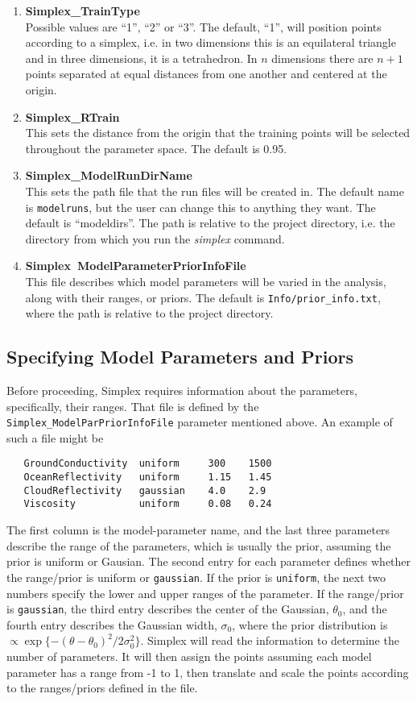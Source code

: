 \documentclass[main.tex]{subfiles}
\begin{document}
\begin{enumerate}\itemsep 0pt
    \item {\bf Simplex\_TrainType}\\
Possible values are ``1'', ``2'' or ``3''. The default, ``1'', will position points according to a simplex, i.e. in two dimensions this is an equilateral triangle and in three dimensions, it is a tetrahedron. In $n$ dimensions there are $n+1$ points separated at equal distances from one another and centered at the origin. 
\item {\bf Simplex\_RTrain}\\
This sets the distance from the origin that the training points will be selected throughout the parameter space. The default is 0.95.
\item {\bf Simplex\_ModelRunDirName}\\
This sets the path file that the run files will be created in. The default name is {\tt{modelruns}}, but the user can change this to anything they want. The default is ``modeldirs''. The path is relative to the project directory, i.e. the directory from which you run the {\it simplex} command.
\item {\bf Simplex\ ModelParameterPriorInfoFile}\\
This file describes which model parameters will be varied in the analysis, along with their ranges, or priors. The default is {\tt Info/prior\_info.txt}, where the path is relative to the project directory.
\end{enumerate}

\subsection{Specifying Model Parameters and Priors}

Before proceeding, Simplex requires information about the parameters, specifically, their ranges. That file is defined by the {\tt Simplex\_ModelParPriorInfoFile} parameter mentioned above. An example of such a file might be
{\tt\begin{verbatim}
   GroundConductivity  uniform     300    1500
   OceanReflectivity   uniform     1.15   1.45
   CloudReflectivity   gaussian    4.0    2.9
   Viscosity           uniform     0.08   0.24
\end{verbatim}
}
The first column is the model-parameter name, and the last three parameters describe the range of the parameters, which is usually the prior, assuming the prior is uniform or Gausian. The second entry for each parameter defines whether the range/prior is uniform or {\tt gaussian}. If the prior is {\tt uniform}, the next two numbers specify the lower and upper ranges of the parameter. If the range/prior is {\tt gaussian}, the third entry describes the center of the Gaussian, $\theta_0$, and the fourth entry describes the Gaussian width, $\sigma_0$, where the prior distribution is $\propto \exp\{-(\theta-\theta_0)^2/2\sigma_0^2\}$. Simplex will read the information to determine the number of parameters. It will then assign the points assuming each model parameter has a range from -1 to 1, then translate and scale the points according to the ranges/priors defined in the file.
\end{document}
